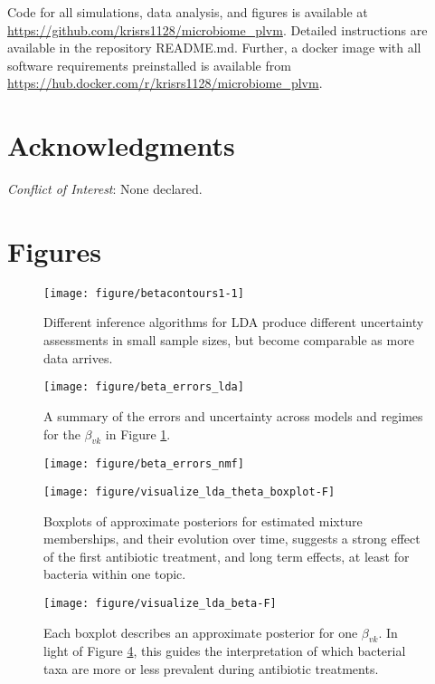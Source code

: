 \documentclass[oupdraft]{bio}
\begin{document}
Code for all simulations, data analysis, and figures is available at
\url{https://github.com/krisrs1128/microbiome_plvm}. Detailed instructions are
available in the repository README.md. Further, a docker image with all software
requirements preinstalled is available from
\url{https://hub.docker.com/r/krisrs1128/microbiome_plvm}.

\section*{Acknowledgments}

{\it Conflict of Interest}: None declared.




\section{Figures}

\begin{figure}[!p]
  \centering\texttt{[image: figure/betacontours1-1]}
  \caption{Different inference algorithms for LDA produce different uncertainty
    assessments in small sample sizes, but become comparable as more data arrives.}
  \label{fig:lda_contours}
\end{figure}

\begin{figure}[!p]
  \centering
  \texttt{[image: figure/beta\_errors\_lda]}
  \caption{A summary of the errors and uncertainty across models and regimes for
    the $\beta_{vk}$ in Figure
    \ref{fig:lda_contours}. \label{fig:beta_errors_lda} }
\end{figure}

\begin{figure}[!p]
  \centering
  \texttt{[image: figure/beta\_errors\_nmf]}
  \caption{\label{fig:zinf_errors_beta} }
\end{figure}

\begin{figure}[!p]
  \centering\texttt{[image: figure/visualize\_lda\_theta\_boxplot-F]}
  \caption{Boxplots of approximate posteriors for estimated mixture memberships,
    and their evolution over time, suggests a strong effect of the first
    antibiotic treatment, and long term effects, at least for bacteria within
    one topic.}
  \label{fig:antibiotics_lda_theta}
\end{figure}

\begin{figure}[!p]
  \centering\texttt{[image: figure/visualize\_lda\_beta-F]}
  \caption{Each boxplot describes an approximate posterior for one $\beta_{vk}$.
    In light of Figure \ref{fig:antibiotics_lda_theta}, this guides the
    interpretation of which bacterial taxa are more or less prevalent during
    antibiotic treatments.}
  \label{fig:antibiotics_lda_beta}
\end{figure}
\end{document}
